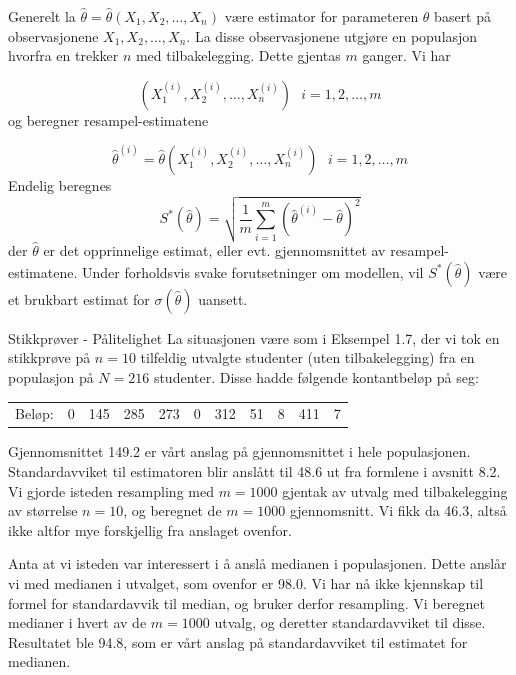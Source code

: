 Generelt la $\hat{\theta}=\hat{\theta}(X_1, X_2, \ldots, X_n)$ være
estimator for parameteren $\theta$ basert på observasjonene 
$X_1, X_2, \ldots, X_n$. La disse observasjonene utgjøre en populasjon
hvorfra en trekker $n$ med tilbakelegging. Dette gjentas $m$ ganger. Vi har


\[ (X_1^{(i)}, X_2^{(i)}, \ldots, X_n^{(i)}) 
                        \mbox{\ \ \ \ } i=1, 2, \ldots , m  \]
og beregner resampel-estimatene

\[ \hat{\theta}^{(i)}=\hat{\theta}(X_1^{(i)}, X_2^{(i)}, \ldots, X_n^{(i)})
                        \mbox{\ \ \ \ } i=1, 2, \ldots , m  \]
Endelig beregnes
\[ S^{*}(\hat{\theta})= \sqrt{\frac{1}{m}\sum_{i=1}^{m}
                   {(\hat{\theta}^{(i)}-\hat{\theta})}^2} \]
der $\hat{\theta}$ er det opprinnelige estimat, eller evt. gjennomsnittet av
resampel-estimatene. Under forholdsvis svake forutsetninger om modellen, vil 
$S^{*}(\hat{\theta})$ være et brukbart estimat for $\sigma(\hat{\theta})$ 
uansett.\\


\begin{eksempel}{Stikkprøver - Pålitelighet}
La situasjonen være som i Eksempel 1.7, der vi tok en stikkprøve på
$n=10$ tilfeldig utvalgte studenter (uten tilbakelegging) fra en populasjon
på $N=216$ studenter. Disse hadde følgende kontantbeløp på seg:
\begin{center}
\begin{tabular}{lcccccccccc}
Beløp: & 0 & 145 & 285 & 273 & 0 & 312 & 51 & 8 & 411 & 7
\end{tabular}
\end{center}
Gjennomsnittet 149.2 er vårt anslag på gjennomsnittet i hele populasjonen.
Standardavviket til estimatoren blir anslått til 48.6 ut fra formlene i
avsnitt 8.2.
Vi gjorde isteden resampling med $m=1000$ gjentak av utvalg med tilbakelegging
av størrelse $n=10$, og beregnet de $m=1000$ gjennomsnitt. Vi fikk da
46.3, altså ikke altfor mye forskjellig fra anslaget ovenfor.

Anta at vi isteden var interessert i å anslå medianen i populasjonen.
Dette anslår vi med medianen i utvalget, som ovenfor er 98.0. Vi har nå 
ikke kjennskap til formel for standardavvik til median, og bruker
derfor resampling. Vi beregnet medianer i hvert av de $m=1000$ utvalg,
og deretter standardavviket til disse. Resultatet ble 94.8, som er
vårt anslag på stan\-dard\-avviket til estimatet for medianen.
\end{eksempel}

	
